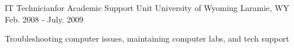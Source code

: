 \begin{cventries}
\begin{displaySection}

    \cventry
    {IT Technicianfor Academic Support Unit} %
    {University of Wyoming} %
    {Laramie, WY} %
    {Feb. 2008 - July. 2009} %
    { %
    \begin{cvitems}
    \item {Troubleshooting computer issues, maintaining computer labs, and tech support}
    \end{cvitems}
    }

\end{displaySection}

\end{cventries}